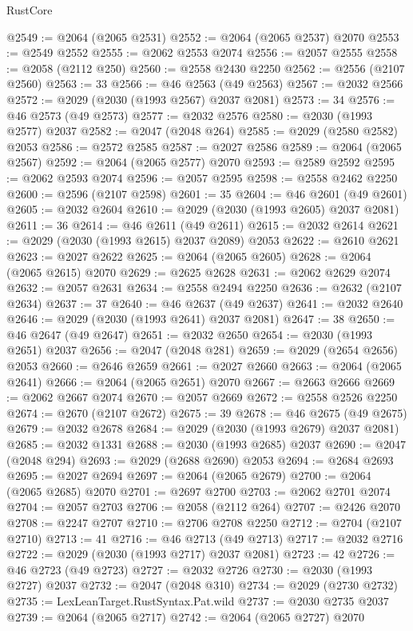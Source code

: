 \begin{lexlean}{RustCore}
\begin{coremodule}
@2549 := @2064 (@2065 @2531)
@2552 := @2064 (@2065 @2537) @2070
@2553 := @2549 @2552
@2555 := @2062 @2553 @2074
@2556 := @2057 @2555
@2558 := @2058 (@2112 @250)
@2560 := @2558 @2430 @2250
@2562 := @2556 (@2107 @2560)
@2563 := 33
@2566 := @46 @2563 (@49 @2563)
@2567 := @2032 @2566
@2572 := @2029 (@2030 (@1993 @2567) @2037 @2081)
@2573 := 34
@2576 := @46 @2573 (@49 @2573)
@2577 := @2032 @2576
@2580 := @2030 (@1993 @2577) @2037
@2582 := @2047 (@2048 @264)
@2585 := @2029 (@2580 @2582) @2053
@2586 := @2572 @2585
@2587 := @2027 @2586
@2589 := @2064 (@2065 @2567)
@2592 := @2064 (@2065 @2577) @2070
@2593 := @2589 @2592
@2595 := @2062 @2593 @2074
@2596 := @2057 @2595
@2598 := @2558 @2462 @2250
@2600 := @2596 (@2107 @2598)
@2601 := 35
@2604 := @46 @2601 (@49 @2601)
@2605 := @2032 @2604
@2610 := @2029 (@2030 (@1993 @2605) @2037 @2081)
@2611 := 36
@2614 := @46 @2611 (@49 @2611)
@2615 := @2032 @2614
@2621 := @2029 (@2030 (@1993 @2615) @2037 @2089) @2053
@2622 := @2610 @2621
@2623 := @2027 @2622
@2625 := @2064 (@2065 @2605)
@2628 := @2064 (@2065 @2615) @2070
@2629 := @2625 @2628
@2631 := @2062 @2629 @2074
@2632 := @2057 @2631
@2634 := @2558 @2494 @2250
@2636 := @2632 (@2107 @2634)
@2637 := 37
@2640 := @46 @2637 (@49 @2637)
@2641 := @2032 @2640
@2646 := @2029 (@2030 (@1993 @2641) @2037 @2081)
@2647 := 38
@2650 := @46 @2647 (@49 @2647)
@2651 := @2032 @2650
@2654 := @2030 (@1993 @2651) @2037
@2656 := @2047 (@2048 @281)
@2659 := @2029 (@2654 @2656) @2053
@2660 := @2646 @2659
@2661 := @2027 @2660
@2663 := @2064 (@2065 @2641)
@2666 := @2064 (@2065 @2651) @2070
@2667 := @2663 @2666
@2669 := @2062 @2667 @2074
@2670 := @2057 @2669
@2672 := @2558 @2526 @2250
@2674 := @2670 (@2107 @2672)
@2675 := 39
@2678 := @46 @2675 (@49 @2675)
@2679 := @2032 @2678
@2684 := @2029 (@2030 (@1993 @2679) @2037 @2081)
@2685 := @2032 @1331
@2688 := @2030 (@1993 @2685) @2037
@2690 := @2047 (@2048 @294)
@2693 := @2029 (@2688 @2690) @2053
@2694 := @2684 @2693
@2695 := @2027 @2694
@2697 := @2064 (@2065 @2679)
@2700 := @2064 (@2065 @2685) @2070
@2701 := @2697 @2700
@2703 := @2062 @2701 @2074
@2704 := @2057 @2703
@2706 := @2058 (@2112 @264)
@2707 := @2426 @2070
@2708 := @2247 @2707
@2710 := @2706 @2708 @2250
@2712 := @2704 (@2107 @2710)
@2713 := 41
@2716 := @46 @2713 (@49 @2713)
@2717 := @2032 @2716
@2722 := @2029 (@2030 (@1993 @2717) @2037 @2081)
@2723 := 42
@2726 := @46 @2723 (@49 @2723)
@2727 := @2032 @2726
@2730 := @2030 (@1993 @2727) @2037
@2732 := @2047 (@2048 @310)
@2734 := @2029 (@2730 @2732)
@2735 := LexLeanTarget.RustSyntax.Pat.wild
@2737 := @2030 @2735 @2037
@2739 := @2064 (@2065 @2717)
@2742 := @2064 (@2065 @2727) @2070

\end{coremodule}
\end{lexlean}
